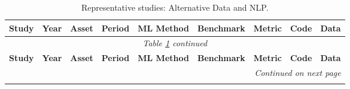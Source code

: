 \begin{longtable}{@{}p{2.4cm} c p{1.0cm} p{1.0cm} p{2.0cm} p{1.9cm} p{1.4cm} c p{1.4cm}@{}}
\caption{Representative studies: Alternative Data and NLP.}\label{tab:master_altdata} \\
\toprule
\textbf{Study} & \textbf{Year} & \textbf{Asset} & \textbf{Period} & \textbf{ML Method} & \textbf{Benchmark} & \textbf{Metric} & \textbf{Code} & \textbf{Data} \\
\midrule
\endfirsthead
\multicolumn{9}{c}{\textit{Table \ref{tab:master_altdata} continued}} \\
\toprule
\textbf{Study} & \textbf{Year} & \textbf{Asset} & \textbf{Period} & \textbf{ML Method} & \textbf{Benchmark} & \textbf{Metric} & \textbf{Code} & \textbf{Data} \\
\midrule
\endhead
\midrule
\multicolumn{9}{r}{\textit{Continued on next page}} \\
\endfoot
\bottomrule
\endlastfoot


\end{longtable}
